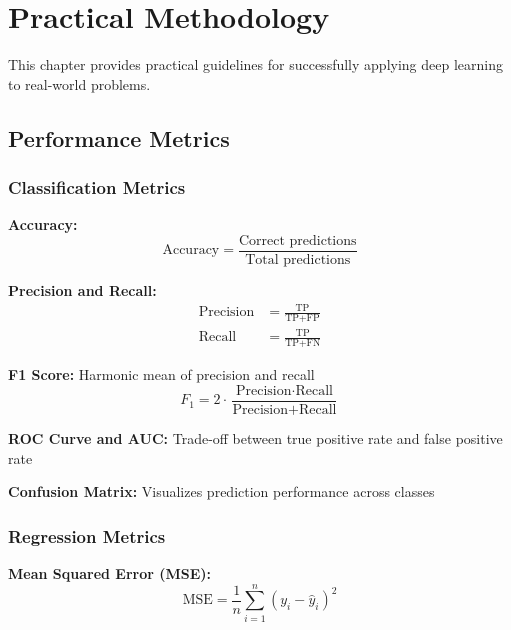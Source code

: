 
\chapter{Practical Methodology}
\label{chap:practical-methodology}

This chapter provides practical guidelines for successfully applying deep learning to real-world problems.

\section{Performance Metrics}
\label{sec:performance-metrics}

\subsection{Classification Metrics}

\textbf{Accuracy:}
\begin{equation}
\text{Accuracy} = \frac{\text{Correct predictions}}{\text{Total predictions}}
\end{equation}

\textbf{Precision and Recall:}
\begin{align}
\text{Precision} &= \frac{\text{TP}}{\text{TP} + \text{FP}} \\
\text{Recall} &= \frac{\text{TP}}{\text{TP} + \text{FN}}
\end{align}

\textbf{F1 Score:} Harmonic mean of precision and recall
\begin{equation}
F_1 = 2 \cdot \frac{\text{Precision} \cdot \text{Recall}}{\text{Precision} + \text{Recall}}
\end{equation}

\textbf{ROC Curve and AUC:} Trade-off between true positive rate and false positive rate

\textbf{Confusion Matrix:} Visualizes prediction performance across classes

\subsection{Regression Metrics}

\textbf{Mean Squared Error (MSE):}
\begin{equation}
\text{MSE} = \frac{1}{n} \sum_{i=1}^{n} (y_i - \hat{y}_i)^2
\end{equation}

